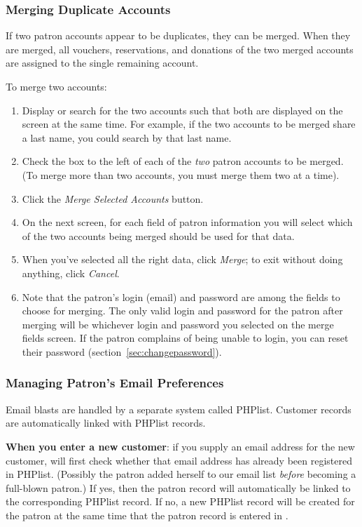 \subsubsection{Merging Duplicate Accounts}
\label{sec:merging}

If two patron accounts appear to be duplicates, they can be merged.
When they are merged, all vouchers, reservations, and donations of the
two merged accounts are assigned to the single remaining account.

To merge two accounts:
\begin{enumerate}
\item Display or search for the two accounts such that both are
  displayed on the screen at the same time.  For example, if the two
  accounts to be merged share a last name, you could search by that last
  name.
\item Check the box to the left of each of the \emph{two} patron
  accounts to be merged.  (To merge more than two accounts, you must
  merge them two at a time).
\item Click the \emph{Merge Selected Accounts} button.
\item On the next screen, for each field of patron information you will
  select which of the two accounts being merged should be used for that
  data.
\item When you've selected all the right data, click \emph{Merge}; to
  exit without doing anything, click \emph{Cancel}.
\item Note that the patron's login (email) and password are among the
  fields to choose for merging.  The only valid login and password for
  the patron after merging will be whichever login and password you
  selected on the merge fields screen.  If the patron complains of being
  unable to login, you can reset their password
  (section~\ref{sec:changepassword}). 
\end{enumerate}


\subsubsection{Managing Patron's Email Preferences}
\label{sec:phplist}

Email blasts are handled by a separate system called PHPlist.
Customer records are automatically linked with PHPlist records.

\textbf{When you enter a new customer}: if you supply an email address
for the new customer, \af will first check whether that email address
has already been registered in PHPlist.  (Possibly the patron added
herself to our email list \emph{before} becoming a full-blown patron.)
If yes, then the \af patron record will automatically be linked to the
corresponding PHPlist record.  If no, a new PHPlist record will be
created for the patron at the same time that the patron record is
entered in \af.

